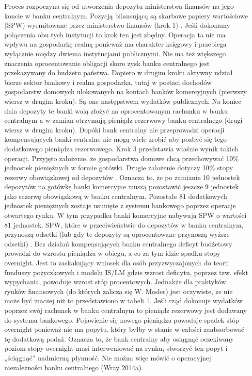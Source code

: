 \documentclass[
]{book}
\begin{document}
Proces rozpoczyna się od utworzenia depozytu ministerstwa finansów na jego koncie w banku centralnym. Pozycją bilansującą są skarbowe papiery wartościowe (SPW) wyemitowane przez ministerstwo finansów (krok 1) . Jeśli dokonamy połączenia obu tych instytucji to krok ten jest zbędny. Operacja ta nie ma wpływu na gospodarkę realną ponieważ ma charakter księgowy i przebiega wyłącznie między dwiema instytucjami publicznymi. Nie ma też większego znaczenia oprocentowanie obligacji skoro zysk banku centralnego jest przekazywany do budżetu państwa. Dopiero w drugim kroku aktywny udział bierze sektor bankowy i realna gospodarka, tutaj w postaci dochodów gospodarstw domowych ulokowanych na kontach banków komercyjnych (pierwszy wiersz w drugim kroku). Są one następstwem wydatków publicznych. Na koniec dnia depozyty te banki wolą złożyć na oprocentowanym rachunku w banku centralnym a w zamian otrzymują pieniądz rezerwowy banku centralnego (drugi wiersz w drugim kroku). Dopóki bank centralny nie przeprowadzi operacji kompensujących banki centralne nie mogą wiele zrobić aby pozbyć się tego dodatkowego pieniądza rezerwowego. Krok 3 przedstawia właśnie wynik takich operacji. Przyjęto założenie, że gospodarstwa domowe chcą przechowywać 10\% jednostek pieniężnych w formie gotówki. Drugie założenie dotyczy 10\% stopy rezerwy obowiązkowej od depozytów . Oznacza to, że po zamianie 10 jednostek depozytów na gotówkę banki komercyjne muszą pozostawić jeszcze 9 jednostek jako rezerwę obowiązkową w banku centralnym. Pozostałe 81 dodatkowych jednostek pieniężnych zostaje usunięte z systemu bankowego poprzez operacje otwartego rynku. W tym przypadku banki komercyjne nabywają SPW o wartości 81 jednostek. SPW, które w przeciwieństwie do depozytów w banku centralnym, przynoszą odsetki (lub gdy te depozyty są oprocentowane przynoszą wyższe odsetki) .
Bez działań kompensujących banku centralnego deficyt budżetowy prowadzi do wzrostu pieniądza w obiegu, a co za tym idzie spadku stopy overnight. Jest to zaskakujący wniosek dla osób przyzwyczajonych do teorii funduszy pożyczkowych i modelu IS/LM gdzie wzrost deficytu, poprzez tzw. efekt wypychania, powoduje wzrost stóp procentowych. Jednakże dla praktyków rynków finansowych (do których zalicza się W. Mosler) jest oczywiste, że nie może być inaczej niż to przedstawiono w tabeli 1. Jeśli rząd dokonuje wydatków poprzez swój rachunek w banku centralnym to pieniądz rezerwowy jest dodawany do systemu bankowego. Pojawienie się nowego pieniądza powoduje spadek stóp overnight ponieważ nie ma popytu, który byłby w stanie w całości zaabsorbować tę dodatkową podaż. Oznacza to, że bank centralny aby osiągnąć oczekiwany poziom stopy overnight musi interweniować na rynku, stworzyć ten popyt i „ściągnąć'' nadmierną płynność. Nie można więc mówić o operacyjnej niezależności banku centralnego (Wray 2014a).
\end{document}
